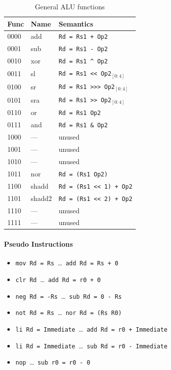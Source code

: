 \documentclass[a4paper,fontsize=10pt,twoside,DIV15,BCOR12mm,headinclude=true,footinclude=false,pagesize,bibtotoc]{scrbook}
\newcommand{\XOR}{\textasciicircum\xspace}
\newcommand{\OR}{\textbar\xspace}
\newcommand{\AND}{\&\xspace}
\newcommand{\NOT}{\texttildelow}
\newcommand{\shl}{\textless$\!$\textless\xspace}
\newcommand{\shr}{\textgreater$\!$\textgreater$\!$\textgreater\xspace}
\newcommand{\ashr}{\textgreater$\!$\textgreater\xspace}
\begin{document}
\begin{table}[hb]
  \centering
  \begin{tabular}{lll}
    \toprule
    Func & Name   & Semantics \\
    \midrule
    0000 & add    & \texttt{Rd = Rs1 + Op2} \\
    0001 & sub    & \texttt{Rd = Rs1 - Op2} \\
    0010 & xor    & \texttt{Rd = Rs1 \XOR Op2} \\
    0011 & sl     & \texttt{Rd = Rs1 \shl Op2$_{[0:4]}$} \\
    0100 & sr     & \texttt{Rd = Rs1 \shr Op2$_{[0:4]}$} \\
    0101 & sra    & \texttt{Rd = Rs1 \ashr Op2$_{[0:4]}$} \\
    0110 & or     & \texttt{Rd = Rs1 \OR Op2} \\
    0111 & and    & \texttt{Rd = Rs1 \AND Op2} \\
    \cmidrule{1-3}
    1000 & ---	& unused \\
    1001 & ---    & unused \\
    1010 & ---    & unused \\
    1011 & nor    & \texttt{Rd = \NOT (Rs1 \OR Op2)} \\
    1100 & shadd  & \texttt{Rd = (Rs1 \shl 1) + Op2} \\
    1101 & shadd2 & \texttt{Rd = (Rs1 \shl 2) + Op2} \\
    1110 & ---    & unused \\
    1111 & ---    & unused \\
    \bottomrule
  \end{tabular}
  \caption{General ALU functions}
  \label{tab:alufunc}
\end{table}

\paragraph{Pseudo Instructions}
\begin{itemize}
  \item \texttt{mov Rd = Rs}~\dots~\texttt{add Rd = Rs + 0}
  \item \texttt{clr Rd}~\dots~\texttt{add Rd = r0 + 0}
  \item \texttt{neg Rd = -Rs}~\dots~\texttt{sub Rd = 0 - Rs}
  \item \texttt{not Rd = \NOT Rs}~\dots~\texttt{nor Rd = \NOT (Rs \OR R0)}
  \item \texttt{li Rd = Immediate}~\dots~\texttt{add Rd = r0 + Immediate}
  \item \texttt{li Rd = Immediate}~\dots~\texttt{sub Rd = r0 - Immediate}
  \item \texttt{nop}~\dots~\texttt{sub r0 = r0 - 0}
\end{itemize}
\end{document}
